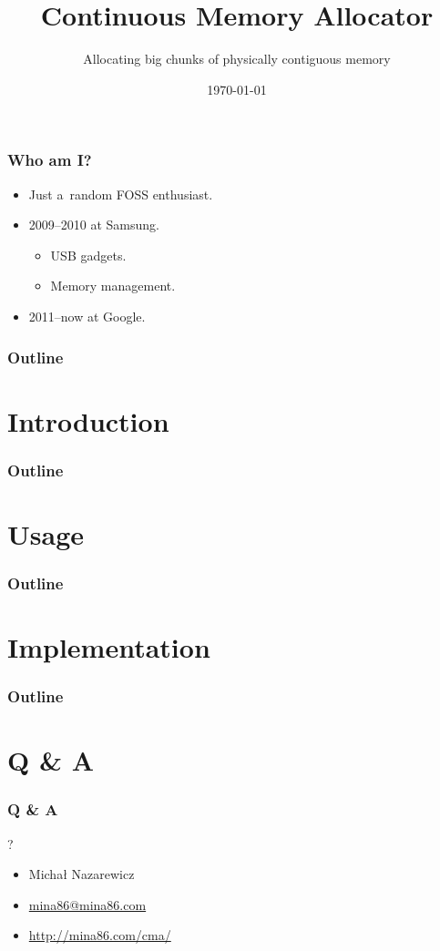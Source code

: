 \documentclass{beamer}
\title{Continuous Memory Allocator}
\subtitle{Allocating big chunks of physically contiguous memory}
\author[\theauthor]{%
  \texorpdfstring{\theauthor\vskip 8pt%
    \scriptsize\href{mailto:\theemail}{\theemail}}{%
    \theauthor}}
\institute{\Google}
\date{\today}
\makeatletter
\newcommand\Section[1]{%
\section{#1}%
\begin{frame}%
\frametitle{Outline}
\tableofcontents[currentsection]%
\end{frame}}
\newcommand\theauthor{Michał Nazarewicz}
\newcommand\theemail{mina86@mina86.com}
\makeatother
\begin{document}
\begin{frame}
  \titlepage
\end{frame}

\begin{frame}
  \frametitle{Who am I?}

  \begin{itemize}
  \item Just a~random FOSS enthusiast.
  \item 2009--2010 at Samsung.
    \begin{itemize}
    \item USB gadgets.
    \item Memory management.
    \end{itemize}
  \item 2011--now at Google.
  \end{itemize}
\end{frame}

\begin{frame}
  \frametitle{Outline}
  \tableofcontents
\end{frame}

\Section{Introduction}


\Section{Usage}



\Section{Implementation}


\appendix

\section*{Q \& A}
\begin{frame}
  \frametitle{Q \& A}

  \begin{center}
  {\Huge ?}
  \end{center}

  \vskip 30pt

  \begin{itemize}
  \item \theauthor
  \item \href{mailto:\theemail}{\theemail}
  \item \url{http://mina86.com/cma/}
  \end{itemize}
\end{frame}
\end{document}

